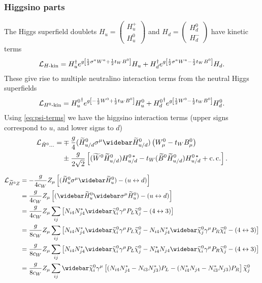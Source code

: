 \documentclass[english, notitlepage]{article}
\begin{document}
        
        \subsubsection{Higgsino parts}
            The Higgs superfield doublets $H_u = \begin{pmatrix} H_u^+ \\ H_u^0 \end{pmatrix}$ and $H_d = \begin{pmatrix} H_d^0 \\ H_d^- \end{pmatrix}$ have kinetic terms
                \begin{align}
                    \mathcal{L}_{H\text{-kin}} = H_u^\dag e^{g\left[\frac{1}{2}\sigma^a W^a + \frac{1}{2}t_W B^0\right]} H_u + H_d^\dag e^{g\left[\frac{1}{2}\sigma^a W^a - \frac{1}{2}t_WB^0\right]} H_d.
                \end{align}
            These give rise to multiple neutralino interaction terms from the neutral Higgs superfields
            \begin{align}
                \mathcal{L}_{H^0\text{-kin}} = {H_u^0}^\dag e^{g\left[-\frac{1}{2}W^0 + \frac{1}{2}t_W B^0\right]} H_u^0 + {H_d^0}^\dag e^{g\left[\frac{1}{2}W^0 - \frac{1}{2}t_W B^0\right]} H_d^0.
            \end{align}
            Using \cref{eq:psi-terms} we have the higgsino interaction terms (upper signs correspond to $u$, and lower signs to $d$)
            \begin{align} \nonumber
                \L_{\tilde{H}^0...} = & \mp \frac{g}{4} (\wtilde{H}^0_{u/d} \sigma^\mu \wbar{\wtilde{H}}^0_{u/d})\pclosed{W^0_\mu - t_W B^0_\mu} \\
                &\pm \frac{g}{2\sqrt{2}} \bclosed{(\wtilde{W}^0 \wtilde{H}^0_{u/d}) H^{0\,*}_{u/d} - t_W (\wtilde{B}^0 \wtilde{H}^0_{u/d}) H^{0\,*}_{u/d} + \cc}.
            \end{align}


            \begin{align} \nonumber
                \L_{\wtilde{H}^0Z} &= -\frac{g}{4c_W} Z_\mu \bclosed{(\hinou\sigma^\mu\barhinou) - (u \leftrightarrow d)} \\ \nonumber
                &= \frac{g}{4c_W} Z_\mu \bclosed{(\barhinou\wbar{\sigma}^\mu\hinou) - (u \leftrightarrow d)} \\ \nonumber
                &= \frac{g}{4c_W} Z_\mu \sum_{ij} \bclosed{N_{i4}N_{j4}^* \barnino[i]\gamma^\mu P_L \nino[j] - (4 \leftrightarrow 3)} \\ \nonumber
                &= \frac{g}{8c_W} Z_\mu \sum_{ij} \bclosed{N_{i4}N_{j4}^* \barnino[i]\gamma^\mu P_L \nino[j] - N_{i4}N_{j4}^* \barnino[j]\gamma^\mu P_R \nino[i] - (4 \leftrightarrow 3)} \\ \nonumber
                &= \frac{g}{8c_W} Z_\mu \sum_{ij} \bclosed{N_{i4}N_{j4}^* \barnino[i]\gamma^\mu P_L \nino[j] - N_{i4}^*N_{j4} \barnino[i]\gamma^\mu P_R \nino[j] - (4 \leftrightarrow 3)} \\
                &= \frac{g}{8c_W} Z_\mu \sum_{ij} \barnino[i] \gamma^\mu \bclosed{ (N_{i4}N_{j4}^* - N_{i3}N_{j3}^*)P_L - (N_{i4}^*N_{j4} - N_{i3}^*N_{j3})P_R } \nino[j]
            \end{align}
\end{document}
